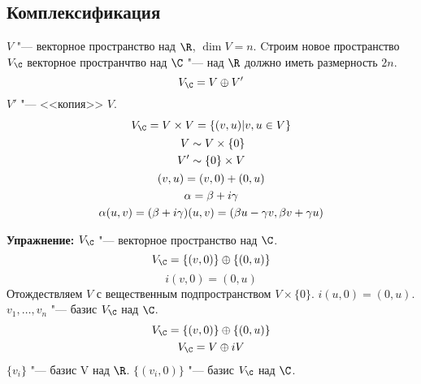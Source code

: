 \subsection{Комплексификация}

$V$ "--- векторное пространство над $\R$, $\dim V = n$.
Cтроим новое пространство $V_{\C}$ векторное пространчтво над $\C$ "--- над $\R$ должно иметь размерность $2n$.
\[ V_{\C} = V \oplus V' \]
$V'$ "--- <<копия>> $V$.
\begin{gather*}
	V_{\C} = V \times V = \{(v, u)| v, u \in V\} \\
	\begin{aligned}
		V  &\sim V \times \{0\} \\
		V' &\sim \{0\} \times V
	\end{aligned} \\
	(v, u) = (v, 0) + (0, u) \\
	\alpha = \beta + i \gamma \\
	\alpha(u, v) = (\beta + i \gamma)(u, v) = (\beta u - \gamma v, \beta v + \gamma u)
\end{gather*}

\textbf{Упражнение: }
$V_{\C}$ "--- векторное пространство над $\C$.
$$V_{\C} = \{(v, 0)\} \oplus \{(0, u)\}$$
$$i(v, 0) = (0, u)$$
Отождествляем $V$ с вещественным подпространством $V \times \{0\}$.
$i(u, 0) = (0, u)$.
$v_1, \dots, v_n$ "--- базис $V_{\C}$ над $\C$.
\begin{gather*}
	V_{\C} = \{(v, 0)\} \oplus \{(0, u)\} \\
	V_{\C} = V \oplus iV
\end{gather*}
$\{v_i\}$ "--- базис V над $\R$.
$\{(v_i, 0)\}$ "--- базис $V_{\C}$ над $\C$.

